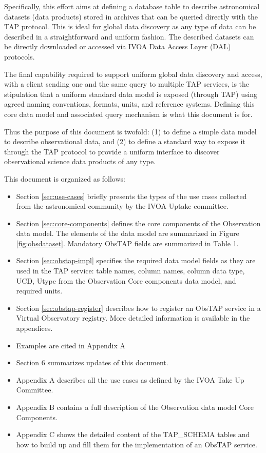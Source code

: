 \documentclass[11pt,a4paper]{ivoa}
\begin{document}
Specifically, this effort aims at defining a database table to describe astronomical datasets (data products) stored in
archives that can be queried directly with the TAP protocol.  This is ideal for global data discovery as any type of
data can be described in a straightforward and uniform fashion.  The described datasets can be directly downloaded or
accessed via IVOA Data Access Layer (DAL) protocols. 

The final capability required to support uniform global data discovery and access, with a client sending one and the
same query to multiple TAP services, is the stipulation that a uniform standard data model is exposed (through TAP)
using agreed naming conventions, formats, units, and reference systems.  Defining this core data model and associated
query mechanism is what this document is for.  

Thus the purpose of this document is twofold: (1) to define a simple data model to describe observational data, and (2)
to define a standard way to expose it through the TAP protocol to provide a uniform interface to discover observational
science data products of any type.

This document is organized as follows:
\begin{itemize}
\item Section \ref{sec:use-cases} briefly presents the types of the use cases collected from the astronomical
community by the IVOA Uptake committee. 
\item Section \ref{sec:core-components} defines the core components of the Observation data model. The elements of the data
model are summarized in Figure \ref{fig:obsdataset}. Mandatory ObsTAP fields are summarized in Table 1.
\item Section \ref{sec:obstap-impl} specifies the required data model fields as they are used in the TAP service: table
names, column names, column data type, UCD, Utype from the Observation Core components data model, and required units. 
\item Section \ref{sec:obstap-register} describes how to register an ObsTAP service in a Virtual Observatory registry. 
More detailed information is available in the appendices.
\item Examples are cited in Appendix A
\item Section 6 summarizes updates of this document.
\item Appendix A describes all the use cases as defined by the IVOA Take Up Committee.
\item Appendix B contains a full description of the Observation data model Core Components.
\item Appendix C shows the detailed content of the TAP\_SCHEMA tables and how to build up and fill them for the
implementation of an ObsTAP service.
\end{itemize}
\end{document}

